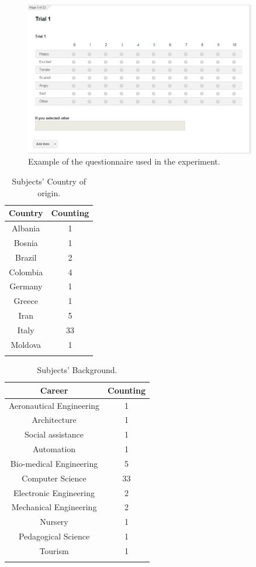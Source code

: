 \begin{figure}
	\centering
	\includegraphics[width=0.90\textwidth]{./Images/example_survey.png} 
	\caption{Example of the questionnaire used in the experiment.}
	\label{fig:questionnaire_example}
\end{figure}

\begin{table}[h]
\caption{Subjects' Country of origin.}
\label{table:country}
\begin{tabular}{|c|c|}
\hline
\textbf{Country} & \textbf{Counting} \\
\hline
Albania & 1 \\
\hline
Bosnia & 1 \\
\hline
Brazil & 2 \\
\hline
Colombia & 4 \\
\hline
Germany & 1 \\
\hline
Greece & 1 \\
\hline
Iran & 5 \\
\hline
Italy & 33 \\
\hline
Moldova & 1 \\
\hline 
\multicolumn{2}{c}{}
\end{tabular} 
\end{table}

\begin{table}[h]
\caption{Subjects' Background.}
\label{table:career}
\begin{tabular}{|c|c|}
\hline
\textbf{Career} & \textbf{Counting}\\
\hline
Aeronautical Engineering & 1 \\
\hline
Architecture & 1 \\
\hline
Social assistance & 1 \\
\hline
Automation & 1 \\
\hline
Bio-medical Engineering & 5 \\
\hline
Computer Science & 33 \\
\hline
Electronic Engineering & 2 \\
\hline
Mechanical Engineering & 2 \\
\hline
Nursery & 1 \\
\hline
Pedagogical Science & 1 \\
\hline
Tourism & 1 \\
\hline
\multicolumn{2}{c}{}
\end{tabular} 
\end{table}